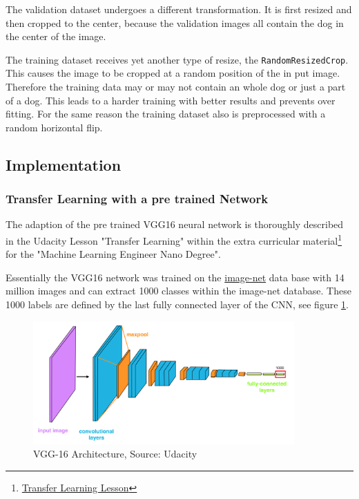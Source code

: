 \documentclass[paper=A4, DIV=10, parskip=half]{scrartcl}
\begin{document}
The validation dataset undergoes a different transformation. It is first resized
and then cropped to the center, because the validation images all contain the
dog in the center of the image.

The training dataset receives yet another type of resize, the
\lstinline{RandomResizedCrop}. This causes the image to be cropped at a random
position of the in put image. Therefore the training data may or may not contain
an whole dog or just a part of a dog. This leads to a harder training with
better results and prevents over fitting. For the same reason the training
dataset also is preprocessed with a random horizontal flip.


\subsection*{Implementation}

\subsubsection*{Transfer Learning with a pre trained Network}

The adaption of the pre trained VGG16 neural network is thoroughly described in
the Udacity Lesson "Transfer Learning" within the extra curricular
material\footnote{\href{https://classroom.udacity.com/nanodegrees/nd009-ent/parts/a73e944a-fdd9-4469-9c67-a618aab59b18/modules/7862c5aa-2097-4dfa-9776-cbfe245d7b83/lessons/a559990d-e214-4c5d-a424-437f6299383e/concepts/bd6c99ac-2c4f-4a80-9ae4-adb4403666c2}{Transfer
Learning Lesson}} for the "Machine Learning Engineer Nano Degree".

Essentially the VGG16 network was trained on the
\href{http://www.image-net.org/}{image-net} data base with 14 million images and
can extract 1000 classes within the image-net database. These 1000 labels are
defined by the last fully connected layer of the CNN, see figure
\ref{vgg16arch}.

\begin{figure}[H]
  \centering
  \includegraphics[width=10cm]{images/vgg_16_architecture.png}
  \caption{VGG-16 Architecture, Source: Udacity}
  \label{vgg16arch}
\end{figure}
\end{document}
